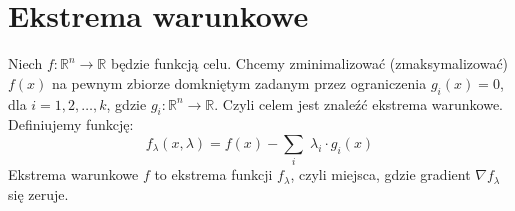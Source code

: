 \section{Ekstrema warunkowe}
Niech \( f: \mathbb{R}^n \rightarrow \mathbb{R} \) będzie funkcją celu. Chcemy zminimalizować (zmaksymalizować) \( f(x) \) na pewnym zbiorze domkniętym zadanym przez ograniczenia \( g_i(x) = 0 \), dla \( i = 1, 2, \dots, k \), gdzie \( g_i: \mathbb{R}^n \rightarrow \mathbb{R} \). Czyli celem jest znaleźć ekstrema warunkowe. Definiujemy funkcję:
\[
	f_{\lambda}(x,\lambda) = f(x) - \sum_{i}\; \lambda_i \cdot g_i(x)
\]
Ekstrema warunkowe \( f \) to ekstrema funkcji \( f_{\lambda} \), czyli miejsca, gdzie
gradient \( \nabla f_{\lambda} \) się zeruje.